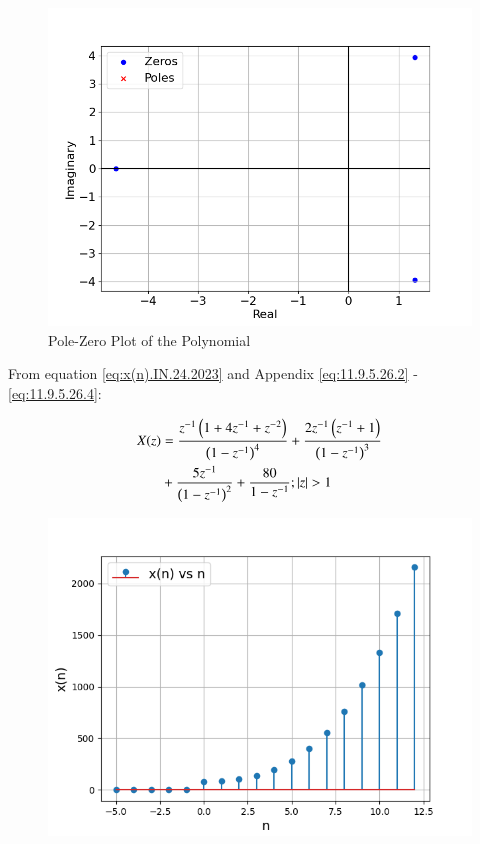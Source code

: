 \documentclass[journal,12pt,twocolumn]{IEEEtran}
\theoremstyle{remark}
\begin{document}

\begin{figure}[htbp]
    \centering
    \includegraphics[width = \columnwidth]{figs/poles and root_plot.png}
  \caption{Pole-Zero Plot of the Polynomial}
    \label{fig:graph1}
\end{figure}

\noindent From equation \eqref{eq:x(n).IN.24.2023} and Appendix \eqref{eq:11.9.5.26.2} - \eqref{eq:11.9.5.26.4}:

\begin{align}
    X(z) &= \frac{z^{-1}\brak{1+4z^{-1}+z^{-2}}}{\brak{1-z^{-1}}^4} + \frac{2z^{-1}\brak{z^{-1}+1}}{\brak{1-z^{-1}}^3} \notag \\
    &+\frac{5z^{-1}}{\brak{1-z^{-1}}^2}+\dfrac{80}{1-z^{-1}} ; |z|>1
\end{align}

\begin{figure}[htbp]
    \centering
    \includegraphics[width = \columnwidth]{figs/x_n_plot.png}
  \caption{}
    \label{fig:graph1.IN.24.2023}
\end{figure}
\end{document}
